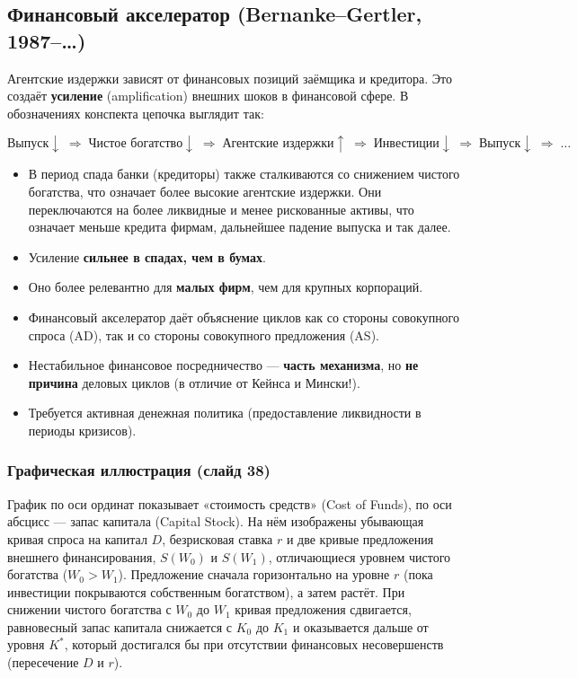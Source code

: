 \documentclass[10pt,a4paper]{article}
\begin{document}
\subsection{Финансовый акселератор (Bernanke--Gertler, 1987--\ldots)}

Агентские издержки зависят от финансовых позиций заёмщика и кредитора. Это создаёт \textbf{усиление} (amplification) внешних шоков в финансовой сфере. В обозначениях конспекта цепочка выглядит так:
\begin{formulabox}
\begin{equation*}
\text{Выпуск}\downarrow \;\Rightarrow\; \text{Чистое богатство}\downarrow \;\Rightarrow\; \text{Агентские издержки}\uparrow \;\Rightarrow\; \text{Инвестиции}\downarrow \;\Rightarrow\; \text{Выпуск}\downarrow \;\Rightarrow\; \dots
\end{equation*}
\end{formulabox}

\begin{itemize}[leftmargin=1.3em]
\item В период спада банки (кредиторы) также сталкиваются со снижением чистого богатства, что означает более высокие агентские издержки. Они переключаются на более ликвидные и менее рискованные активы, что означает меньше кредита фирмам, дальнейшее падение выпуска и так далее.
\item Усиление \textbf{сильнее в спадах, чем в бумах}.
\item Оно более релевантно для \textbf{малых фирм}, чем для крупных корпораций.
\item Финансовый акселератор даёт объяснение циклов как со стороны совокупного спроса (AD), так и со стороны совокупного предложения (AS).
\item Нестабильное финансовое посредничество — \textbf{часть механизма}, но \textbf{не причина} деловых циклов (в отличие от Кейнса и Мински!).
\item Требуется активная денежная политика (предоставление ликвидности в периоды кризисов).
\end{itemize}

\subsubsection{Графическая иллюстрация (слайд 38)}

График по оси ординат показывает «стоимость средств» (Cost of Funds), по оси абсцисс — запас капитала (Capital Stock). На нём изображены убывающая кривая спроса на капитал $D$, безрисковая ставка $r$ и две кривые предложения внешнего финансирования, $S(W_0)$ и $S(W_1)$, отличающиеся уровнем чистого богатства ($W_0>W_1$). Предложение сначала горизонтально на уровне $r$ (пока инвестиции покрываются собственным богатством), а затем растёт. При снижении чистого богатства с $W_0$ до $W_1$ кривая предложения сдвигается, равновесный запас капитала снижается с $K_0$ до $K_1$ и оказывается дальше от уровня $K^{*}$, который достигался бы при отсутствии финансовых несовершенств (пересечение $D$ и $r$).
\end{document}
